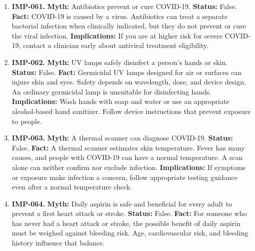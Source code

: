 \documentclass[11pt,oneside]{book}
\begin{document}
\begin{enumerate}[leftmargin=0pt,labelwidth=0pt,labelsep=0pt,itemindent=0pt]
\textbf{Implications:} Do not self-medicate for COVID-19 with these drugs. If prescribed one for another condition, discuss any change with the prescriber.
\item[] \textbf{IMP-061.} \textbf{Myth:} Antibiotics prevent or cure COVID-19.\newline
\textbf{Status:} False.\newline
\textbf{Fact:} COVID-19 is caused by a virus. Antibiotics can treat a separate bacterial infection when clinically indicated, but they do not prevent or cure the viral infection. \cite{ref51,ref391}\newline
\textbf{Implications:} If you are at higher risk for severe COVID-19, contact a clinician early about antiviral treatment eligibility.
\item[] \textbf{IMP-062.} \textbf{Myth:} UV lamps safely disinfect a person's hands or skin.\newline
\textbf{Status:} False.\newline
\textbf{Fact:} Germicidal UV lamps designed for air or surfaces can injure skin and eyes. Safety depends on wavelength, dose, and device design. An ordinary germicidal lamp is unsuitable for disinfecting hands. \cite{ref51,ref315}\newline
\textbf{Implications:} Wash hands with soap and water or use an appropriate alcohol-based hand sanitizer. Follow device instructions that prevent exposure to people.
\item[] \textbf{IMP-063.} \textbf{Myth:} A thermal scanner can diagnose COVID-19.\newline
\textbf{Status:} False.\newline
\textbf{Fact:} A thermal scanner estimates skin temperature. Fever has many causes, and people with COVID-19 can have a normal temperature. A scan alone can neither confirm nor exclude infection. \cite{ref51}\newline
\textbf{Implications:} If symptoms or exposure make infection a concern, follow appropriate testing guidance even after a normal temperature check.
\item[] \textbf{IMP-064.} \textbf{Myth:} Daily aspirin is safe and beneficial for every adult to prevent a first heart attack or stroke.\newline
\textbf{Status:} False.\newline
\textbf{Fact:} For someone who has never had a heart attack or stroke, the possible benefit of daily aspirin must be weighed against bleeding risk. Age, cardiovascular risk, and bleeding history influence that balance. \cite{ref52}\newline

\end{enumerate}
\end{document}
